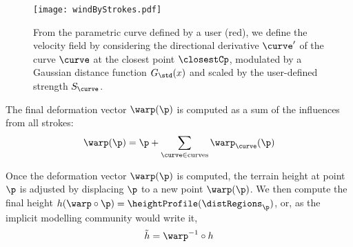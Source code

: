 

\begin{figure}
    \texttt{[image: windByStrokes.pdf]}
    \caption{From the parametric curve defined by a user (red), we define the velocity field by considering the directional derivative $\curve'$ of the curve $\curve$ at the closest point $\closestCp$, modulated by a Gaussian distance function $G_{\std}(x)$ and scaled by the user-defined strength $S_\curve$.}
    \label{fig:coral-island-wind-from-strokes}
\end{figure}

The final deformation vector $\warp(\p)$ is computed as a sum of the influences from all strokes: 
\begin{align}
    \warp(\p) = \p + \sum_{\curve \in \text{curves}} \warp_\curve(\p) 
\end{align}

Once the deformation vector $\warp(\p)$ is computed, the terrain height at point $\p$ is adjusted by displacing $\p$ to a new point $\warp(\p)$.
We then compute the final height $h(\warp \circ \p) = \heightProfile(\distRegions_{\p})$, or, as the implicit modelling community would write it,
\begin{align}
    \Tilde{h} = \warp^{-1} \circ h
\end{align}

